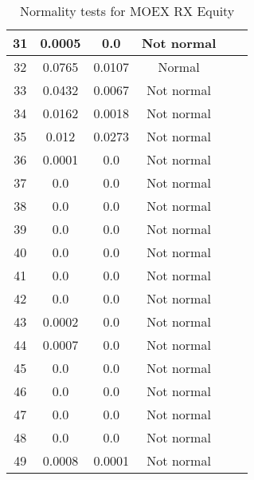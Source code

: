 \begin{table}[h]
\begin{tabular}{|c|c|c|c|c|c|}
		31 & 0.0005 & 0.0 & Not normal\\\hline
		32 & 0.0765 & 0.0107 & Normal\\\hline
		33 & 0.0432 & 0.0067 & Not normal\\\hline
		34 & 0.0162 & 0.0018 & Not normal\\\hline
		35 & 0.012 & 0.0273 & Not normal\\\hline
		36 & 0.0001 & 0.0 & Not normal\\\hline
		37 & 0.0 & 0.0 & Not normal\\\hline
		38 & 0.0 & 0.0 & Not normal\\\hline
		39 & 0.0 & 0.0 & Not normal\\\hline
		40 & 0.0 & 0.0 & Not normal\\\hline
		41 & 0.0 & 0.0 & Not normal\\\hline
		42 & 0.0 & 0.0 & Not normal\\\hline
		43 & 0.0002 & 0.0 & Not normal\\\hline
		44 & 0.0007 & 0.0 & Not normal\\\hline
		45 & 0.0 & 0.0 & Not normal\\\hline
		46 & 0.0 & 0.0 & Not normal\\\hline
		47 & 0.0 & 0.0 & Not normal\\\hline
		48 & 0.0 & 0.0 & Not normal\\\hline
		49 & 0.0008 & 0.0001 & Not normal\\\hline
	\end{tabular}
	\caption{Normality tests for MOEX RX Equity}
	\label{tab:normality_tests_MOEX_}
\end{table}
